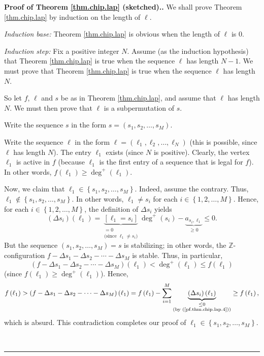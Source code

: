 \documentclass[numbers=enddot,12pt,final,onecolumn,notitlepage]{scrartcl}%
\theoremstyle{definition}
\newenvironment{proof}[1][Proof]{\noindent\textbf{#1.} }{\ \rule{0.5em}{0.5em}}
\let\sumnonlimits\sum
\renewcommand{\sum}{\sumnonlimits\limits}
\newcommand{\ZZ}{\mathbb{Z}}
\begin{document}
\begin{proof}[Proof of Theorem \ref{thm.chip.lap} (sketched).]
We shall prove Theorem \ref{thm.chip.lap} by induction on the length of $\ell$.

\textit{Induction base:} Theorem \ref{thm.chip.lap} is obvious when the length
of $\ell$ is $0$.

\textit{Induction step:} Fix a positive integer $N$. Assume (as the induction
hypothesis) that Theorem \ref{thm.chip.lap} is true when the sequence $\ell$
has length $N-1$. We must prove that Theorem \ref{thm.chip.lap} is true when
the sequence $\ell$ has length $N$.

So let $f$, $\ell$ and $s$ be as in Theorem \ref{thm.chip.lap}, and assume
that $\ell$ has length $N$. We must then prove that $\ell$ is a subpermutation
of $s$.

Write the sequence $s$ in the form $s=\left(  s_{1},s_{2},\ldots,s_{M}\right)
$.

Write the sequence $\ell$ in the form $\ell=\left(  \ell_{1},\ell_{2}%
,\ldots,\ell_{N}\right)  $ (this is possible, since $\ell$ has length $N$).
The entry $\ell_{1}$ exists (since $N$ is positive). Clearly, the vertex
$\ell_{1}$ is active in $f$ (because $\ell_{1}$ is the first entry of a
sequence that is legal for $f$). In other words, $f\left(  \ell_{1}\right)
\geq\deg^{+}\left(  \ell_{1}\right)  $.

Now, we claim that $\ell_{1}\in\left\{  s_{1},s_{2},\ldots,s_{M}\right\}  $.
Indeed, assume the contrary. Thus, $\ell_{1}\notin\left\{  s_{1},s_{2}%
,\ldots,s_{M}\right\}  $. In other words, $\ell_{1}\neq s_{i}$ for each
$i\in\left\{  1,2,\ldots,M\right\}  $. Hence, for each $i\in\left\{
1,2,\ldots,M\right\}  $, the definition of $\Delta s_{i}$ yields
\begin{equation}
\left(  \Delta s_{i}\right)  \left(  \ell_{1}\right)  =\underbrace{\left[
\ell_{1}=s_{i}\right]  }_{\substack{=0\\\text{(since }\ell_{1}\neq
s_{i}\text{)}}}\deg^{+}\left(  s_{i}\right)  -\underbrace{a_{s_{i},\ell_{1}}%
}_{\geq0}\leq0.\label{pf.thm.chip.lap.4}%
\end{equation}
But the sequence $\left(  s_{1},s_{2},\ldots,s_{M}\right)  =s$ is stabilizing;
in other words, the $\ZZ$-configuration $f-\Delta s_{1}-\Delta
s_{2}-\cdots-\Delta s_{M}$ is stable. Thus, in particular,
\[
\left(  f-\Delta s_{1}-\Delta s_{2}-\cdots-\Delta s_{M}\right)  \left(
\ell_{1}\right)  <\deg^{+}\left(  \ell_{1}\right)  \leq f\left(  \ell
_{1}\right)
\]
(since $f\left(  \ell_{1}\right)  \geq\deg^{+}\left(  \ell_{1}\right)  $).
Hence,%
\[
f\left(  \ell_{1}\right)  >\left(  f-\Delta s_{1}-\Delta s_{2}-\cdots-\Delta
s_{M}\right)  \left(  \ell_{1}\right)  =f\left(  \ell_{1}\right)  -\sum
_{i=1}^{M}\underbrace{\left(  \Delta s_{i}\right)  \left(  \ell_{1}\right)
}_{\substack{\leq0\\\text{(by (\ref{pf.thm.chip.lap.4}))}}}\geq f\left(
\ell_{1}\right)  ,
\]
which is absurd. This contradiction completes our proof of $\ell_{1}%
\in\left\{  s_{1},s_{2},\ldots,s_{M}\right\}  $.


\end{proof}
\end{document}
